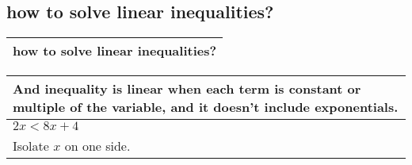 \subsection{
how to solve linear inequalities?}
\begin{small}
    \begin{tabularx}{1\textwidth}{
            p{}
        }
        \toprule

        how to solve linear inequalities?
        \\
        \bottomrule
    \end{tabularx}
\end{small}
\begin{small}
    \begin{tabularx}{1\textwidth}{
            p{}
        }
        \toprule
        And inequality is linear when each term is constant or multiple of the
        variable, and it doesn't include exponentials.
        \\
        \midrule

        $ 2x < 8x + 4$\\
        Isolate $x$ on one side.
        \\
        \bottomrule
    \end{tabularx}
\end{small}
